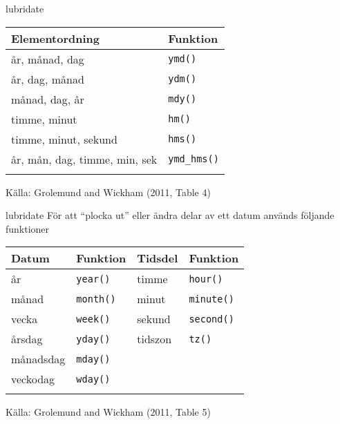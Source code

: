 \documentclass[
  11pt,
  ignorenonframetext,
  handout]{beamer}
\begin{document}
\begin{frame}[fragile]{lubridate}
\label{lubridate-1}
\begin{longtable}[]{@{}ll@{}}
\toprule\noalign{}
Elementordning & Funktion \\
\midrule\noalign{}
\endhead
år, månad, dag & \texttt{ymd()} \\
år, dag, månad & \texttt{ydm()} \\
månad, dag, år & \texttt{mdy()} \\
timme, minut & \texttt{hm()} \\
timme, minut, sekund & \texttt{hms()} \\
år, mån, dag, timme, min, sek & \texttt{ymd\_hms()} \\
\bottomrule\noalign{}
\end{longtable}

Källa: Grolemund and Wickham (2011, Table 4)
\end{frame}

\begin{frame}[fragile]{lubridate}
\label{lubridate-2}
För att ``plocka ut'' eller ändra delar av ett datum används följande
funktioner

\begin{longtable}[]{@{}llll@{}}
\toprule\noalign{}
Datum & Funktion & Tidsdel & Funktion \\
\midrule\noalign{}
\endhead
år & \texttt{year()} & timme & \texttt{hour()} \\
månad & \texttt{month()} & minut & \texttt{minute()} \\
vecka & \texttt{week()} & sekund & \texttt{second()} \\
årsdag & \texttt{yday()} & tidszon & \texttt{tz()} \\
månadsdag & \texttt{mday()} & & \\
veckodag & \texttt{wday()} & & \\
\bottomrule\noalign{}
\end{longtable}

Källa: Grolemund and Wickham (2011, Table 5)
\end{frame}
\end{document}
